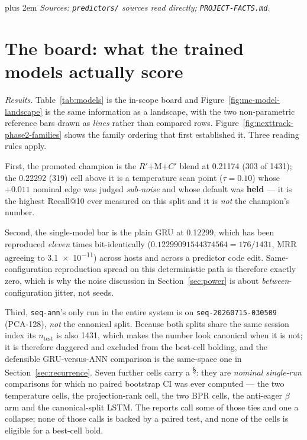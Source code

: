 \documentclass[11pt]{article}
\newcommand{\dsid}[1]{\texttt{\small #1}}
\newcommand{\Rp}{\ensuremath{R'}}
\newcommand{\Cp}{\ensuremath{C'}}
\begin{document}
{\rightskip=0pt plus 2em \emph{Sources: \texttt{predictors/} sources read directly;
\texttt{PROJECT-FACTS.md}.}\par}

\clearpage
\section{The board: what the trained models actually score}
\label{sec:board}

\emph{Results.} Table~\ref{tab:models} is the in-scope board and
Figure~\ref{fig:mc-model-landscape} is the same information as a landscape, with
the two non-parametric reference bars drawn as \emph{lines} rather than compared
rows. Figure~\ref{fig:nexttrack-phase2-families} shows the family ordering that
first established it. Three reading rules apply.

First, the promoted champion is the \Rp+M+\Cp{} blend at \num{0.21174}
(\num{303} of \num{1431}); the \num{0.22292} (\num{319}) cell above it is a
temperature scan point ($\tau=\num{0.10}$) whose $+\num{0.011}$ nominal edge was
judged \emph{sub-noise} and whose default was \textbf{held} --- it is the
highest Recall@10 ever measured on this split and it is \emph{not} the
champion's number.

Second, the single-model bar is the plain GRU at \num{0.12299}, which has been
reproduced \emph{eleven} times bit-identically
($\num{0.12299091544374564}=\num{176}/\num{1431}$, MRR agreeing to
\num{3.1e-11}) across hosts and across a predictor code edit. Same-configuration
reproduction spread on this deterministic path is therefore exactly zero, which
is why the noise discussion in Section~\ref{sec:power} is about
\emph{between}-configuration jitter, not seeds.

Third, \texttt{seq-ann}'s only run in the entire system is on
\dsid{seq-20260715-030509} (PCA-128), \emph{not} the canonical split. Because
both splits share the same session index its $n_{\text{test}}$ is also
\num{1431}, which makes the number look canonical when it is not; it is
therefore daggered and excluded from the best-cell bolding, and the defensible
GRU-versus-ANN comparison is the same-space one in
Section~\ref{sec:recurrence}. Seven further cells carry a
\textsuperscript{\S}: they are \emph{nominal single-run} comparisons for which no
paired bootstrap CI was ever computed --- the two temperature cells, the
projection-rank cell, the two BPR cells, the anti-eager $\beta$ arm and the
canonical-split LSTM. The reports call some of those ties and one a collapse;
none of those calls is backed by a paired test, and none of the cells is eligible
for a best-cell bold.
\end{document}
